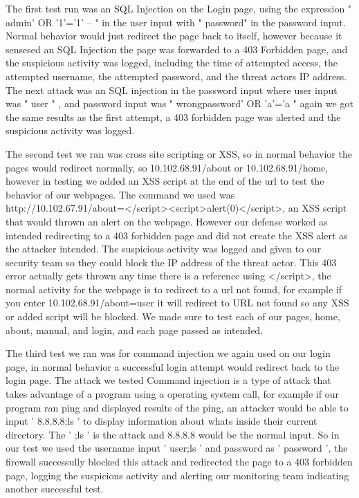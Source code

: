   The first test run was an SQL Injection on the Login page, using the expression " admin' OR '1'='1' -- " in the user input with " password"  in the password input. Normal behavior would just redirect the page back to itself, however because it sensesed an SQL Injection the page was forwarded to a 403 Forbidden page, and the suspicious activity was logged, including the time of attempted access, the attempted username, the attempted password, and the threat actors IP address. The next attack was an SQL injection in the password input where user input was " user " , and password input was " wrongpassword' OR 'a'='a " again we got the same results as the first attempt, a 403 forbidden page was alerted and the suspicious activity was logged. 

  The second test we ran was cross site scripting or XSS, so in normal behavior the pages would redirect normally, so 10.102.68.91/about or 10.102.68.91/home, however in testing we added an XSS script at the end of the url to test the behavior of our webpages. The command we used was http://10.102.67.91/about=</script><script>alert(0)</script>, an XSS script that would thrown an alert on the webpage. However our defense worked as intended redirecting to a 403 forbidden page and did not create the XSS alert as the attacker intended. The suspicious activity was logged and given to our security team so they could block the IP address of the threat actor. This 403 error actually gets thrown any time there is a reference using </script>, the normal activity for the webpage is to redirect to a url not found, for example if you enter 10.102.68.91/about=user it will redirect to URL not found so any XSS or added script will be blocked. We made sure to test each of our pages, home, about, manual, and login, and each page passed as intended.

    The third test we ran was for command injection we again used on our login page, in normal behavior a successful login attempt would redirect back to the login page. The attack we tested Command injection is a type of attack that takes advantage of a program using a operating system call, for example if our program ran ping and displayed results of the ping, an attacker would be able to input ' 8.8.8.8;ls ' to display information about whats inside their current directory. The ' ;ls ' is the attack and 8.8.8.8 would be the normal input. So in our test we used the username input ' user;ls ' and password as ' password ', the firewall successully blocked this attack and redirected the page to a 403 forbidden page, logging the suspicious activity and alerting our monitoring team indicating another successful test. 
